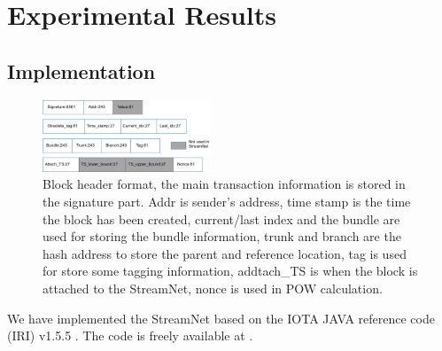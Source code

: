 \section{Experimental Results}

\subsection{Implementation}

\begin{figure}[!ht]
\begin{center}
\includegraphics[width=0.45\textwidth]{figures/block_format.pdf}
    \caption{
        Block header format, the main transaction information is stored in the signature part. Addr is sender's address, time stamp is the time the block has been created, current/last index and the bundle are used for storing the bundle information, trunk and branch are the hash address to store the parent and reference location, tag is used for store some tagging information, addtach\_TS is when the block is attached to the StreamNet, nonce is used in POW calculation.
     }
\label{block_header}
\end{center}
\end{figure}

We have implemented the StreamNet based on the IOTA JAVA reference code (IRI) v1.5.5 \cite{IOTACode}.
The code is freely available at \cite{StreamNet}.

